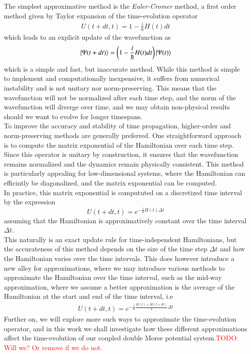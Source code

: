 \documentclass{subfiles}
\begin{document}
The simplest approximative method is the \emph{Euler-Cromer} method, a first order method given by Taylor expansion of the time-evolution operator
\begin{align}
    U(t + dt, t) = 1 - \frac{i}{\hbar}H(t)dt\label{eq:euler_cromer}
\end{align}
which leads to an explicit update of the wavefunction as 
\begin{align*}
    \ket{\Psi(t + dt)} = \bigg(1 - \frac{i}{\hbar}H(t)dt\bigg)\ket{\Psi(t)}
\end{align*}
which is a simple and fast, but inaccurate method. While this method is simple to implement and computationally inexpensive, it suffers from numerical instability and is not unitary nor norm-preserving. This means that the wavefunction will not be normalized after each time step, and the norm of the wavefunction will diverge over time, and we may obtain non-physical results should we want to evolve for longer timespans. \\ 
To improve the accuracy and stability of time propagation, higher-order and norm-preserving methods are generally preferred. One straightforward approach is to compute the matrix exponential of the Hamiltonian over each time step. Since this operator is unitary by construction, it ensures that the wavefunction remains normalized and the dynamics remain physically consistent. This method is particularly appealing for low-dimensional systems, where the Hamiltonian can efficintly be diagonalized, and the matrix exponential can be computed. \\

In practice, this matrix exponential is compututed on a discretized time interval by the expression
\begin{equation}
    U(t + dt, t) = e^{-\frac{i}{\hbar}H(t)\Delta t}\label{eq:numerical_time_evolution_operator}
\end{equation}
assuming that the Hamiltonian is approximatively constant over the time interval $\Delta t$. \\

This naturally is an exact update rule for time-independent Hamiltonians, but the accurateness of this method depends on the size of the time step $\Delta t$ and how the Hamiltonian varies over the time intervals. This does however introduce a new alley for approximations, where we may introduce various methods to approximate the Hamiltonian over the time interval, such as the mid-way approximation, where we assume a better approximation is the average of the Hamiltonian at the start and end of the time interval, i.e
\begin{align*}
    U(t + dt, t) = e^{-\frac{i}{\hbar}\frac{H(t) + H(t + dt)}{2}\Delta t}
\end{align*}
Further on, we will explore more such ways to approximate the time-evolution operator, and in this work we shall investigate how these different approximations affect the time-evolution of our coupled double Morse potential system.\textcolor{red}{TODO: Will we? Or remove if we do not.} \\ 
\end{document}
